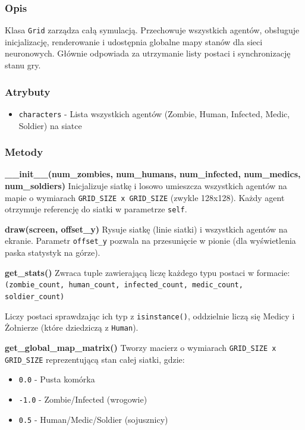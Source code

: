 \documentclass[12pt,a4paper]{article}
\begin{document}
\subsubsection{Opis}
Klasa \texttt{Grid} zarządza całą symulacją. Przechowuje wszystkich agentów,
obsługuje inicjalizację, renderowanie i udostępnia globalne mapy stanów dla
sieci neuronowych. Głównie odpowiada za utrzymanie listy postaci i
synchronizację stanu gry.

\subsubsection{Atrybuty}
\begin{itemize}
	\item \texttt{characters} - Lista wszystkich agentów (Zombie, Human, Infected, Medic, Soldier) na siatce
\end{itemize}

\subsubsection{Metody}

\textbf{\_\_init\_\_(num\_zombies, num\_humans, num\_infected, num\_medics, num\_soldiers)}
Inicjalizuje siatkę i losowo umieszcza wszystkich agentów na mapie o wymiarach \texttt{GRID\_SIZE x GRID\_SIZE} (zwykle 128x128). Każdy agent otrzymuje referencję do siatki w parametrze \texttt{self}.

\textbf{draw(screen, offset\_y)}
Rysuje siatkę (linie siatki) i wszystkich agentów na ekranie. Parametr \texttt{offset\_y} pozwala na przesunięcie w pionie (dla wyświetlenia paska statystyk na górze).

\textbf{get\_stats()}
Zwraca tuple zawierającą liczę każdego typu postaci w formacie:
\texttt{(zombie\_count, human\_count, infected\_count, medic\_count, soldier\_count)}

Liczy postaci sprawdzając ich typ z \texttt{isinstance()}, oddzielnie liczą się
Medicy i Żołnierze (które dziedziczą z \texttt{Human}).

\textbf{get\_global\_map\_matrix()}
Tworzy macierz o wymiarach \texttt{GRID\_SIZE x GRID\_SIZE} reprezentującą stan całej siatki, gdzie:
\begin{itemize}
	\item \texttt{0.0} - Pusta komórka
	\item \texttt{-1.0} - Zombie/Infected (wrogowie)
	\item \texttt{0.5} - Human/Medic/Soldier (sojusznicy)
\end{itemize}
\end{document}
